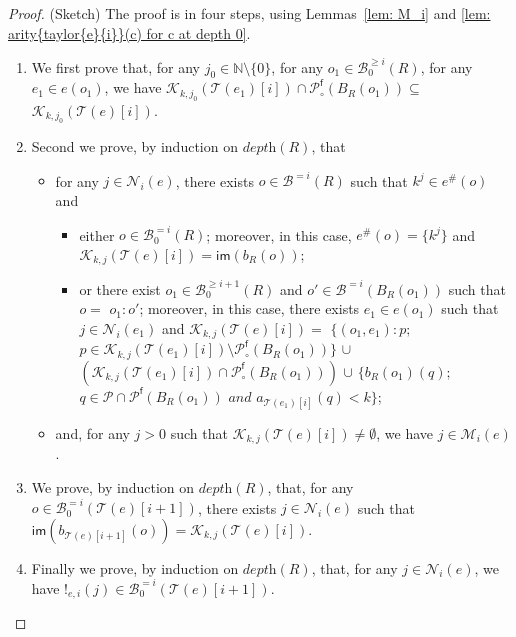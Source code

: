 \documentclass{article}
\theoremstyle{plain}
\newcommand{\Nat}{\ensuremath{\mathbb{N}}}
\newcommand{\taylor}[2]{\mathcal{T}(#1)[#2]}
\newcommand{\criticalports}[3]{\mathcal{K}_{#2, #3}(#1)}
\newcommand{\depthof}[1]{\textit{depth}(#1)}
\newcommand{\im}[1]{\textsf{im}(#1)}
\newcommand{\arity}[1]{{\textit{a}}_{#1}}
\newcommand{\conclusions}[1]{\mathcal{P}^{\textsf{f}}(#1)}
\newcommand{\conclusionscirc}[1]{\mathcal{P}_\circ^{\textsf{f}}(#1)}
\newcommand{\exactboxes}[2]{\mathcal{B}^{=#2}(#1)}
\newcommand{\exactboxesatzero}[2]{\mathcal{B}_{0}^{=#2}(#1)}
\newcommand{\boxesatzerogeq}[2]{\mathcal{B}_0^{\geq #2}(#1)}
\begin{document}
\begin{proof}
(Sketch) The proof is in four steps, using Lemmas~\ref{lem: M_i} and \ref{lem: arity{taylor{e}{i}}(c) for c at depth 0}. \begin{enumerate}
\item\label{item: step1} We first prove that, for any $j_0 \in \Nat \setminus \{ 0 \}$, for any $o_1 \in \boxesatzerogeq{R}{i}$, for any $e_1 \in e(o_1)$, we have $\criticalports{\taylor{e_1}{i}}{k}{j_0} \cap \conclusionscirc{B_R(o_1)} \subseteq$ $\criticalports{\taylor{e}{i}}{k}{j_0}$.
\item\label{item: step2} Second we prove, by induction on $\depthof{R}$, that
\begin{itemize}
\item for any $j \in \mathcal{N}_i(e)$, there exists $o \in \exactboxes{R}{i}$ such that $k^j \in e^\#(o)$ and
\begin{itemize}
\item either $o \in \exactboxesatzero{R}{i}$; moreover, in this case, $e^\#(o) = \{ k^j \}$ and $\criticalports{\taylor{e}{i}}{k}{j} = \im{b_R(o)}$;
\item or there exist $o_1 \in \boxesatzerogeq{R}{i+1}$ and $o' \in \exactboxes{B_R(o_1)}{i}$ such that $o = $ \mbox{$o_1:o'$;}  moreover, in this case, there exists $e_1 \in e(o_1)$ such that $j \in \mathcal{N}_i(e_1)$ and $\criticalports{\taylor{e}{i}}{k}{j} = $ 
$\{ (o_1, e_1) : p ;$ $p \in \criticalports{\taylor{e_1}{i}}{k}{j} \setminus \conclusionscirc{B_R(o_1)} \}$ $\cup$ $(\criticalports{\taylor{e_1}{i}}{k}{j} \cap \conclusionscirc{B_R(o_1)})$ $\cup$ $\{ b_R(o_1)(q) ;$ $q \in \mathcal{P} \cap \conclusions{B_R(o_1)} \textit{ and } \arity{\taylor{e_1}{i}}(q) < k \}$;
\end{itemize}
\item and, for any $j > 0$ such that $\criticalports{\taylor{e}{i}}{k}{j} \not= \emptyset$, we have $j \in \mathcal{M}_i(e)$.
\end{itemize}
\item\label{item: step3} We prove, by induction on $\depthof{R}$, that, for any $o \in \exactboxesatzero{\taylor{e}{i+1}}{i}$, there exists $j \in \mathcal{N}_{i}(e)$ such that $\im{b_{\taylor{e}{i+1}}(o)} = \criticalports{\taylor{e}{i}}{k}{j}$. \item\label{item: step4} Finally we prove, by induction on $\depthof{R}$, that, for any $j \in \mathcal{N}_i(e)$, we have $!_{e, i}(j) \in \exactboxesatzero{\taylor{e}{i+1}}{i}$. 
\end{enumerate}
\end{proof}
\end{document}
